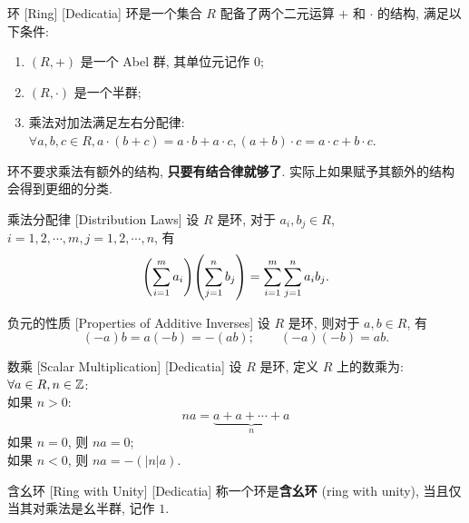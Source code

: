         \begin{dfn}
            {环}
            [Ring]
            [Dedicatia]
            环是一个集合 \(R\) 配备了两个二元运算 \(+\) 和 \(\cdot\) 的结构, 满足以下条件:
            \begin{enumerate}
                \item \((R, +)\) 是一个 Abel 群, 其单位元记作 \(0\);
                \item \((R, \cdot)\) 是一个半群;
                \item 乘法对加法满足左右分配律: \(\forall a,b,c\in R, a\cdot(b+c)=a\cdot b+a\cdot c, (a+b)\cdot c=a\cdot c+b\cdot c\).
            \end{enumerate}
        \end{dfn}

        \begin{rmk}
            [Dedicatia]
            环不要求乘法有额外的结构, \textbf{只要有结合律就够了}. 实际上如果赋予其额外的结构会得到更细的分类.
        \end{rmk}

        \begin{ppt}
            {乘法分配律}
            [Distribution Laws]
            设 \(R\) 是环, 对于 \(a_i,b_j\in R\), \(i=1,2,\cdots,m, j=1,2,\cdots,n\), 有
            \[\qty(\sum_{i=1}^{m}a_i)\qty(\sum_{j=1}^{n}b_j)=\sum_{i=1}^{m}\sum_{j=1}^{n}a_i b_j.\]
        \end{ppt}

        \begin{ppt}
            {负元的性质}
            [Properties of Additive Inverses]
            设 \(R\) 是环, 则对于 \(a,b\in R\), 有
            \[(-a)b=a(-b)=-(ab);\qquad (-a)(-b)=ab.\]
        \end{ppt}

        \begin{dfn}
            {数乘}
            [Scalar Multiplication]
            [Dedicatia]
            设 \(R\) 是环, 定义 \(R\) 上的数乘为: \(\forall a\in R, n\in\operatorname{\mathbb{Z}}\): \\
            如果 \(n>0\):
            \[na=\underbrace{a+a+\cdots+a}_{n}\]
            如果 \(n=0\), 则 \(na=0\);\\
            如果 \(n<0\), 则 \(na=-(|n|a)\).
        \end{dfn}

        \begin{dfn}
            {含幺环}
            [Ring with Unity]
            [Dedicatia]
            称一个环是\textbf{含幺环} (ring with unity), 当且仅当其对乘法是幺半群, 记作 \(1\).
        \end{dfn}

